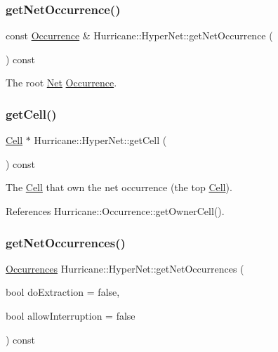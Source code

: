 \subsubsection{\texorpdfstring{get\+Net\+Occurrence()}{getNetOccurrence()}}
{\footnotesize\ttfamily const \mbox{\hyperlink{classHurricane_1_1Occurrence}{Occurrence}} \& Hurricane\+::\+Hyper\+Net\+::get\+Net\+Occurrence (\begin{DoxyParamCaption}{ }\end{DoxyParamCaption}) const\hspace{0.3cm}{\ttfamily [inline]}}

The root \mbox{\hyperlink{classHurricane_1_1Net}{Net}} \mbox{\hyperlink{classHurricane_1_1Occurrence}{Occurrence}}. \mbox{\label{classHurricane_1_1HyperNet_a5a818c5887d1d8dd2e0a59e8a57c02d7}} 
\subsubsection{\texorpdfstring{get\+Cell()}{getCell()}}
{\footnotesize\ttfamily \mbox{\hyperlink{classHurricane_1_1Cell}{Cell}} $\ast$ Hurricane\+::\+Hyper\+Net\+::get\+Cell (\begin{DoxyParamCaption}{ }\end{DoxyParamCaption}) const\hspace{0.3cm}{\ttfamily [inline]}}

The \mbox{\hyperlink{classHurricane_1_1Cell}{Cell}} that own the net occurrence (the top \mbox{\hyperlink{classHurricane_1_1Cell}{Cell}}). 

References Hurricane\+::\+Occurrence\+::get\+Owner\+Cell().

\mbox{\label{classHurricane_1_1HyperNet_a02180e650b1f2e5b87bf4774a5799ebc}} 
\subsubsection{\texorpdfstring{get\+Net\+Occurrences()}{getNetOccurrences()}}
{\footnotesize\ttfamily \mbox{\hyperlink{namespaceHurricane_a1912927c128eee859af62dbe4cbe0a6b}{Occurrences}} Hurricane\+::\+Hyper\+Net\+::get\+Net\+Occurrences (\begin{DoxyParamCaption}\item[{bool}]{do\+Extraction = {\ttfamily false},  }\item[{bool}]{allow\+Interruption = {\ttfamily false} }\end{DoxyParamCaption}) const}


